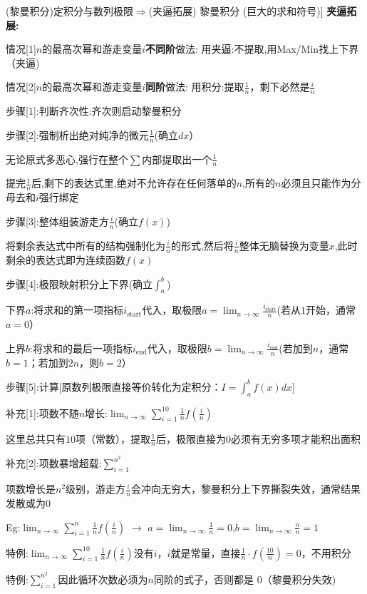 \documentclass[11pt,a4paper,UTF8]{ctexart}
\begin{document}
\begin{thmbox}[[7](黎曼积分)定积分与数列极限$\Rightarrow$(夹逼拓展) 黎曼积分 (巨大的求和符号)]
\textbf{夹逼拓展:} 

情况[1]$n$的最高次幂和游走变量$i$\textbf{不同阶}做法: 用夹逼:不提取,用Max/Min找上下界（夹逼)

情况[2]$n$的最高次幂和游走变量$i$\textbf{同阶}做法:   用积分:提取$\frac{1}{n}$，剩下必然是$\frac{i}{n}$

步骤[1]:判断齐次性:齐次则启动黎曼积分

步骤[2]:强制析出绝对纯净的微元$\frac{1}{n}$(确立$dx$）

  无论原式多恶心,强行在整个$\sum$内部提取出一个$\frac{1}{n}$

  提完$\frac{1}{n}$后,剩下的表达式里,绝对不允许存在任何落单的$n$,所有的$n$必须且只能作为分母去和$i$强行绑定

步骤[3]:整体组装游走方$\frac{i}{n}$(确立$f(x)$) 

  将剩余表达式中所有的结构强制化为$\frac{i}{n}$的形式,然后将$\frac{i}{n}$整体无脑替换为变量$x$,此时剩余的表达式即为连续函数$f(x)$

步骤[4]:极限映射积分上下界(确立$\int_a^b$)

下界$a$:将求和的第一项指标$i_{\text{start}}$代入，取极限$a = \lim_{n \to \infty} \frac{i_{\text{start}}}{n}$(若从$1$开始，通常$a=0$）

上界$b$:将求和的最后一项指标$i_{\text{end}}$代入，取极限$b = \lim_{n \to \infty} \frac{i_{\text{end}}}{n}$(若加到$n$，通常$b=1$；若加到$2n$，则$b=2$）

步骤[5]:计算[原数列极限直接等价转化为定积分：$I = \int_a^b f(x) dx$]

补充[1]:项数不随$n$增长:$\lim_{n \to \infty} \sum_{i=1}^{10} \frac{1}{n}f(\frac{i}{n})$

  这里总共只有$10$项（常数），提取$\frac{1}{n}$后，极限直接为$0$必须有无穷多项才能积出面积

补充[2]:项数暴增超载:$\sum_{i=1}^{n^2}$

  项数增长是$n^2$级别，游走方$\frac{i}{n}$会冲向无穷大，黎曼积分上下界撕裂失效，通常结果发散或为$0$

Eg:$\lim_{n \to \infty} \sum_{i=1}^n \frac{1}{n}f(\frac{i}{n})$ $\to$ $a = \lim_{n \to \infty} \frac{1}{n} = 0$,$b = \lim_{n \to \infty} \frac{n}{n} = 1$

  特例:$\lim_{n \to \infty} \sum_{i=1}^{10} \frac{1}{n}f(\frac{i}{n})$没有$i$，$i$就是常量，直接$\frac{1}{n} \cdot f(\frac{10}{n}) = 0$，不用积分

  特例:$\sum_{i=1}^{n^2}$因此循环次数必须为$n$同阶的式子，否则都是 0（黎曼积分失效)


\end{thmbox}
\end{document}
